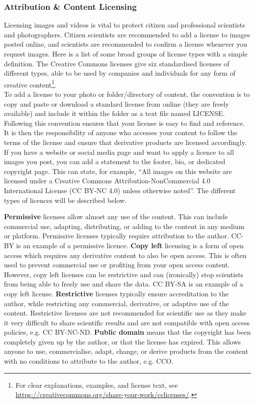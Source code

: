 \documentclass{article}
\newcommand{\contributed}[1]{%
    \par\noindent
    \begingroup
    \setlength{\leftskip}{1em}%
    \itshape
    Contributors: #1
    \par
    \endgroup
    \vspace{0.5em}
}
\begin{document}
\subsubsection{Attribution \& Content Licensing}\label{sec:licensing}
Licensing images and videos is vital to protect citizen and professional scientists and photographers. Citizen scientists are recommended to add a license to images posted online, and scientists are recommended to confirm a license whenever you request images. Here is a list of some broad groups of license types with a simple definition. The Creative Commons licenses give six standardised licenses of different types, able to be used by companies and individuals for any form of creative content\footnote{For clear explanations, examples, and license text, see \url{https://creativecommons.org/share-your-work/cclicenses/}.}. \\

To add a license to your photo or folder/directory of content, the convention is to copy and paste or download a standard license from online (they are freely available) and include it within the folder as a text file named LICENSE. Following this convention ensures that your license is easy to find and reference. It is then the responsibility of anyone who accesses your content to follow the terms of the license and ensure that derivative products are licensed accordingly. If you have a website or social media page and want to apply a licence to all images you post, you can add a statement to the footer, bio, or dedicated copyright page. This can state, for example, ``All images on this website are licensed under a Creative Commons Attribution-NonCommercial 4.0 International License (CC BY-NC 4.0) unless otherwise noted''. The different types of licences will be described below.

\textbf{Permissive} licenses allow almost any use of the content. This can include commercial use, adapting, distributing, or adding to the content in any medium or platform. Permissive licenses typically require attribution to the author. CC-BY is an example of a permissive licence.
\textbf{Copy left} licensing is a form of open access which requires any derivative content to also be open access. This is often used to prevent commercial use or profiting from your open access content. However, copy left licenses can be restrictive and can (ironically) stop scientists from being able to freely use and share the data. CC BY-SA is an example of a copy left license.
\textbf{Restrictive} licenses typically ensure accreditation to the author, while restricting any commercial, derivative, or adaptive use of the content. Restrictive licenses are not recommended for scientific use as they make it very difficult to share scientific results and are not compatible with open access policies, e.g. CC BY-NC-ND.
\textbf{Public domain} means that the copyright has been completely given up by the author, or that the license has expired. This allows anyone to use, commercialise, adapt, change, or derive products from the content with no conditions to attribute to the author, e.g. CCO. \\
\end{document}
